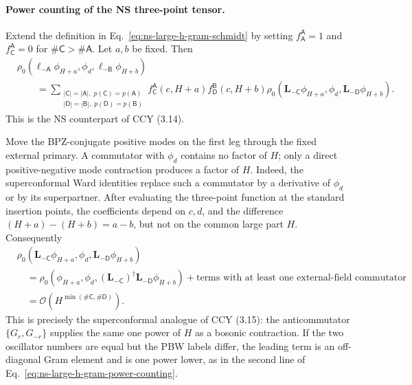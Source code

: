 \documentclass[11pt]{article}
\newcommand{\order}{\mathcal O}
\begin{document}
\paragraph{Power counting of the NS three-point tensor.}
Extend the definition in Eq.~\eqref{eq:ns-large-h-gram-schmidt} by setting
\(f^{\mathsf A}_{\mathsf A}=1\) and
\(f^{\mathsf A}_{\mathsf C}=0\) for
\(\#\mathsf C>\#\mathsf A\).  Let \(a,b\) be fixed.  Then
\begin{equation}
 \begin{split}
 &\rho_0\!\left(
 \boldsymbol\ell_{-\mathsf A}\phi_{H+a},
 \phi_d,
 \boldsymbol\ell_{-\mathsf B}\phi_{H+b}
 \right)
 \\
 &\qquad=
 \sum_{\substack{
 |\mathsf C|=|\mathsf A|,\;p(\mathsf C)=p(\mathsf A)\\
 |\mathsf D|=|\mathsf B|,\;p(\mathsf D)=p(\mathsf B)}}
 f^{\mathsf A}_{\mathsf C}(c,H+a)
 f^{\mathsf B}_{\mathsf D}(c,H+b)
 \rho_0\!\left(
 \mathbf L_{-\mathsf C}\phi_{H+a},
 \phi_d,
 \mathbf L_{-\mathsf D}\phi_{H+b}
 \right).
 \end{split}
 \label{eq:ns-large-h-three-point-expansion}
\end{equation}
This is the NS counterpart of CCY (3.14).

Move the BPZ-conjugate positive modes on the first leg through the fixed
external primary.  A commutator with \(\phi_d\) contains no factor of \(H\);
only a direct positive-negative mode contraction produces a factor of \(H\).
Indeed, the superconformal Ward identities replace such a commutator by a
derivative of \(\phi_d\) or by its superpartner.  After evaluating the
three-point function at the standard insertion points, the coefficients
depend on \(c,d\), and the difference
\((H+a)-(H+b)=a-b\), but not on the common large part \(H\).
Consequently
\begin{equation}
 \begin{split}
 &\rho_0\!\left(
 \mathbf L_{-\mathsf C}\phi_{H+a},
 \phi_d,
 \mathbf L_{-\mathsf D}\phi_{H+b}
 \right)
 \\
 &\quad=
 \rho_0\!\left(
 \phi_{H+a},\phi_d,
 (\mathbf L_{-\mathsf C})^\dagger
 \mathbf L_{-\mathsf D}\phi_{H+b}
 \right)
 +\text{terms with at least one external-field commutator}
 \\
 &\quad=
 \order\!\left(
 H^{\min(\#\mathsf C,\#\mathsf D)}
 \right).
 \end{split}
 \label{eq:ns-large-h-ward-power-counting}
\end{equation}
This is precisely the superconformal analogue of CCY (3.15): the
anticommutator \(\{G_r,G_{-r}\}\) supplies the same one power of \(H\) as a
bosonic contraction.  If the two oscillator numbers are equal but the PBW
labels differ, the leading term is an off-diagonal Gram element and is one
power lower, as in the second line of
Eq.~\eqref{eq:ns-large-h-gram-power-counting}.
\end{document}
